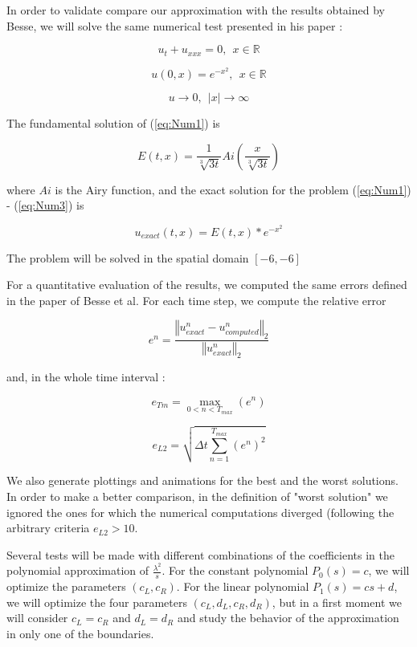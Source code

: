 \indent In order to validate compare our approximation with the results obtained by Besse, we will solve the same numerical test presented in his paper : 

\begin{equation}
\label{eq:Num1}
 u_t + u_{xxx} = 0, \ \ x \in \mathbb{R}
\end{equation}

\begin{equation}
\label{eq:Num2}
 u(0,x) = e^{-x^2}, \ \ x \in \mathbb{R} 
\end{equation}

\begin{equation}
\label{eq:Num3}
 u \rightarrow 0, \ \ |x| \rightarrow \infty
\end{equation}

\indent The fundamental solution of (\ref{eq:Num1}) is

\begin{equation}
    E(t,x) = \frac{1}{\sqrt[3]{3t}}Ai\left(\frac{x}{\sqrt[3]{3t}} \right)
\end{equation}

\noindent where $Ai$ is the Airy function, and the exact solution for the problem (\ref{eq:Num1}) - (\ref{eq:Num3}) is

\begin{equation}
    u_{exact}(t,x) = E(t,x) * e^{-x^2}
\end{equation}

\indent The problem will be solved in the spatial domain $[-6,-6]$

\indent For a quantitative evaluation of the results, we computed the same errors defined in the paper of Besse et al. For each time step, we compute the relative error

$$e^n = \frac{\left\Vert u_{exact}^n - u_{computed}^n\right\Vert_2}{\left\Vert u_{exact}^n\right\Vert_2}$$

\noindent and, in the whole time interval :

$$ e_{Tm} = \max\limits_{0 < n < T_{max}} (e^n) $$

$$ e_{L2} = \sqrt{ \Delta t \sum_{n=1}^{T_{max}} (e^n)^2 } $$

\indent We also generate plottings and animations for the best and the worst solutions. In order to make a better comparison, in the definition of "worst solution" we ignored the ones for which the numerical computations diverged (following the arbitrary criteria $e_{L2} > 10$.

\indent Several tests will be made with different combinations of the coefficients in the polynomial approximation of $\frac{\lambda^2}{s}$. For the constant polynomial $P_0(s) = c$, we will optimize the parameters $(c_L,c_R)$. For the linear polynomial $P_1(s) = cs+d$, we will optimize the four parameters $(c_L,d_L,c_R,d_R)$, but in a first moment we will consider $c_L = c_R$ and $d_L = d_R$ and study the behavior of the approximation in only one of the boundaries.


